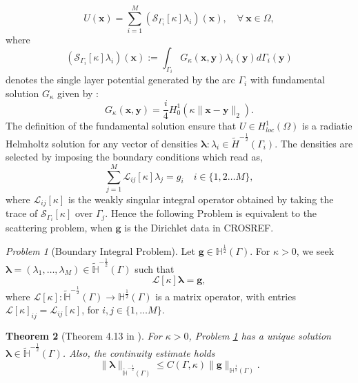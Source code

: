 \documentclass[10pt,reqno]{amsart}
\newcommand{\IH}{\mathbb{H}}
\newtheorem{theorem}{Theorem}[section]
\theoremstyle{remark}
\newtheorem{problem}[theorem]{Problem}
\newcommand{\vg}{\mathbf{g}}
\newcommand{\vx}{\mathbf{x}}
\newcommand{\vy}{\mathbf{y}}
\newcommand{\kk}{\kappa}
\newcommand{\SL}[1]{\mathcal{S}_{#1}}
\newcommand{\half}{\frac{1}{2}}
\newcommand{\opL}{\mathcal{L}}
\newcommand{\bopL}{\boldsymbol{\mathcal{L}}}
\newcommand{\vlambda}{\boldsymbol{\lambda}}
\numberwithin{equation}{section}
\begin{document}
\begin{equation}
\label{eq:intrep}
U(\vx) =  \sum_{i=1}^M  (\SL{\Gamma_i}[\kappa]  \lambda_i)(\vx),\quad \forall \ \vx\in\Omega,
\end{equation}
where 
$$(\SL{\Gamma_i} [\kappa]  \lambda_i)(\vx):= \int_{\Gamma_i}G_\kappa(\vx,\vy)  \lambda_i(\vy)  d\Gamma_i(\vy)$$
denotes the single layer potential generated by the arc $\Gamma_i$ 
with fundamental solution $G_\kk$ given by \cite[Section 3.1]{sauter2010boundary}:
\begin{equation}
\label{eq:FunSol}
G_\kappa(\vx,\vy) = 
\dfrac{i}{4}H^{1}_0(\kk\|\vx-\vy\|_2).
\end{equation}
The definition of the fundamental solution ensure that $U \in H^1_{loc}(\Omega)$ is a radiatie Helmholtz solution for any vector of densities $\vlambda : \lambda_i \in \widetilde{H}^{-\half}(\Gamma_i)$. The densities are selected by imposing the boundary conditions which read as, 
$$\sum_{j =1}^M \opL_{ij}[\kappa] \lambda_j  = g_i \quad i \in  \{1,2 \hdots M\},$$
where $\opL_{ij}[\kappa]$ is the weakly singular integral operator obtained by taking the trace of $\SL{\Gamma_i} [\kappa]$ over $\Gamma_j$. Hence the following Problem is equivalent to the scattering problem, when  $\vg$ is the Dirichlet data in CROSREF.

\begin{problem}[Boundary Integral Problem]
\label{prob:BIE}
Let $\vg \in \IH^{\half}(\Gamma)$. For $\kk>0$, we seek $\vlambda=(\lambda_1,\ldots,\lambda_M)\in\widetilde{\IH}^{-\half}(\Gamma)$ such that
\begin{equation}
\bopL[\kappa] \vlambda = \vg,
\end{equation}
where $
\bopL[\kappa]:\widetilde{\IH}^{-\half}(\Gamma)\rightarrow{\IH}^{\half}(\Gamma)$ is a matrix operator, with entries $\bopL[\kk]_{ij} = \opL_{ij}[\kk]$, for $i,j \in \{1,\hdots M\}$.
\end{problem}

\begin{theorem}[Theorem 4.13 in \cite{PaperA}] \label{theo:invL} 
For $\kk>0$, Problem \ref{prob:BIE} has a unique solution $\vlambda \in \widetilde{\IH}^{-\half}(\Gamma)$. Also, the continuity estimate holds
\begin{equation}
\| \vlambda \|_{\widetilde{\IH}^{-\half}(\Gamma)} \leq C(\Gamma,\kk) \| \vg \|_{\IH^{\half}(\Gamma)}.
\end{equation}
\end{theorem}
\end{document}
